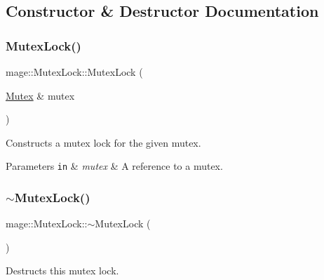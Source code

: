 \subsection{Constructor \& Destructor Documentation}
\hypertarget{structmage_1_1_mutex_lock_aa8cd93677eec2656ca217fdf79f911c4}{}\label{structmage_1_1_mutex_lock_aa8cd93677eec2656ca217fdf79f911c4} 
\subsubsection{\texorpdfstring{Mutex\+Lock()}{MutexLock()}\hspace{0.1cm}{\footnotesize\ttfamily [1/2]}}
{\footnotesize\ttfamily mage\+::\+Mutex\+Lock\+::\+Mutex\+Lock (\begin{DoxyParamCaption}\item[{\hyperlink{classmage_1_1_mutex}{Mutex} \&}]{mutex }\end{DoxyParamCaption})}

Constructs a mutex lock for the given mutex.


\begin{DoxyParams}[1]{Parameters}
\mbox{\tt in}  & {\em mutex} & A reference to a mutex. \\
\hline
\end{DoxyParams}
\hypertarget{structmage_1_1_mutex_lock_a2631e8878646b2d25b136b6adb55d553}{}\label{structmage_1_1_mutex_lock_a2631e8878646b2d25b136b6adb55d553} 
\subsubsection{\texorpdfstring{$\sim$\+Mutex\+Lock()}{~MutexLock()}}
{\footnotesize\ttfamily mage\+::\+Mutex\+Lock\+::$\sim$\+Mutex\+Lock (\begin{DoxyParamCaption}{ }\end{DoxyParamCaption})}

Destructs this mutex lock. \hypertarget{structmage_1_1_mutex_lock_a9bfeb564ac4563e10d8fe569870d0e18}{}\label{structmage_1_1_mutex_lock_a9bfeb564ac4563e10d8fe569870d0e18} 
